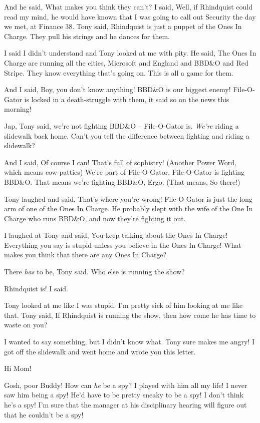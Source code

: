 And he said, What makes you think they can't? I said, Well, if 
Rhindquist could read my mind, he would have known that I was going to 
call out Security the day we met, at Finance 38. Tony said, Rhindquist 
is just a puppet of the Ones In Charge. They pull his strings and he 
dances for them.

I said I didn't understand and Tony looked at me with pity. He said, 
The Ones In Charge are running all the cities, Microsoft and England 
and BBD{\&}O and Red Stripe. They know everything that's going on. This 
is all a game for them.

And I said, Boy, you don't know anything! BBD{\&}O is our biggest 
enemy! File-O-Gator is locked in a death-struggle with them, it said so 
on the news this morning!

Jap, Tony said, we're not fighting BBD{\&}O -- File-O-Gator is. 
\emph{We're} riding a slidewalk back home. Can't you tell the 
difference between fighting and riding a slidewalk?

And I said, Of course I can! That's full of sophistry! (Another Power 
Word, which means cow-patties) We're part of File-O-Gator. File-O-Gator 
is fighting BBD{\&}O. That means we're fighting BBD{\&}O, Ergo. (That 
means, So there!)

Tony laughed and said, That's where you're wrong! File-O-Gator is just 
the long arm of one of the Ones In Charge. He probably slept with the 
wife of the One In Charge who runs BBD{\&}O, and now they're fighting 
it out.

I laughed at Tony and said, You keep talking about the Ones In Charge! 
Everything you say is stupid unless you believe in the Ones In Charge! 
What makes you think that there are any Ones In Charge?

There \emph{has} to be, Tony said. Who else is running the show?

Rhindquist is! I said.

Tony looked at me like I was stupid. I'm pretty sick of him looking at 
me like that. Tony said, If Rhindquist is running the show, then how 
come he has time to waste on you?

I wanted to say something, but I didn't know what. Tony sure makes me 
angry! I got off the slidewalk and went home and wrote you this letter.

\tb

Hi Mom!

Gosh, poor Buddy! How can \emph{he} be a spy? I played with him all my 
life! I never saw him being a spy! He'd have to be pretty sneaky to be 
a spy! I don't think he's a spy! I'm sure that the manager at his 
disciplinary hearing will figure out that he couldn't be a spy!

